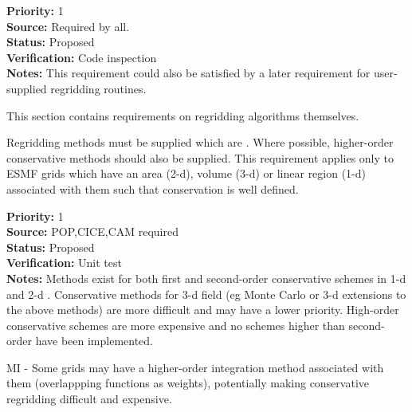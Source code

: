 \begin{reqlist}
{\bf Priority:} 1 \\
{\bf Source:} Required by all. \\
{\bf Status:} Proposed \\
{\bf Verification:} Code inspection  \\
{\bf Notes:} This requirement could also be satisfied by a later requirement
             for user-supplied regridding routines.
\end{reqlist}


This section contains requirements on regridding algorithms themselves.


Regridding methods must be supplied which are
.  Where possible,
higher-order conservative methods should also be supplied.  This requirement
applies only to ESMF grids which have an area (2-d), volume (3-d) or
linear region (1-d) associated with them such that conservation is well
defined.

\begin{reqlist}
{\bf Priority:} 1 \\
{\bf Source:} POP,CICE,CAM required \\
{\bf Status:} Proposed \\
{\bf Verification:} Unit test \\
{\bf Notes:} Methods exist for both first and second-order
             conservative schemes in 1-d and 2-d \cite{Jones1999}.
             Conservative methods for 3-d field (eg Monte Carlo
             or 3-d extensions to the above methods) are more difficult
             and may have a lower priority.
             High-order conservative schemes are more expensive and
             no schemes higher than second-order have been implemented.

             MI - Some grids may have a higher-order integration method
             associated with them (overlappping functions as weights),
             potentially making conservative regridding difficult and expensive.
\end{reqlist}


